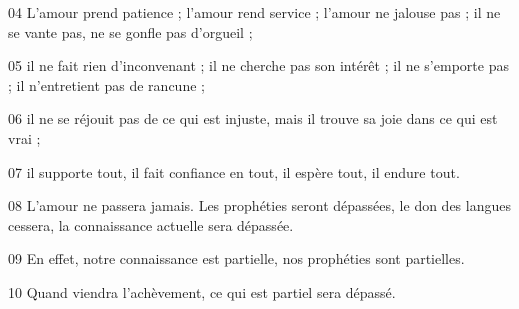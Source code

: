 
04 L’amour prend patience ; l’amour rend service ; l’amour ne jalouse pas ; il ne se vante pas, ne se gonfle pas d’orgueil ;

05 il ne fait rien d’inconvenant ; il ne cherche pas son intérêt ; il ne s’emporte pas ; il n’entretient pas de rancune ;

06 il ne se réjouit pas de ce qui est injuste, mais il trouve sa joie dans ce qui est vrai ;

07 il supporte tout, il fait confiance en tout, il espère tout, il endure tout.

08 L’amour ne passera jamais. Les prophéties seront dépassées, le don des langues cessera, la connaissance actuelle sera dépassée.

09 En effet, notre connaissance est partielle, nos prophéties sont partielles.

10 Quand viendra l’achèvement, ce qui est partiel sera dépassé.
